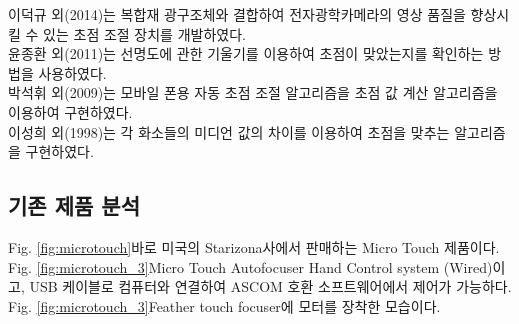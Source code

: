 이덕규 외(2014)는 복합재 광구조체와 결합하여 전자광학카메라의 영상 품질을 향상시킬 수 있는 초점 조절 장치를 개발하였다.\cite{leedukgu2014}\\
윤종환 외(2011)는 선명도에 관한 기울기를 이용하여 초점이 맞았는지를 확인하는 방법을 사용하였다.\cite{yunjonghwan2011lcd}\\
박석휘 외(2009)는 모바일 폰용 자동 초점 조절 알고리즘을 초점 값 계산 알고리즘을 이용하여 구현하였다.\cite{parksukhui2009Median}\\
이성희 외(1998)는 각 화소들의 미디언 값의 차이를 이용하여 초점을 맞추는 알고리즘을 구현하였다.\cite{leeseonghee1998Median}


\subsection{기존 제품 분석}

Fig. \ref{fig:microtouch}\가 바로 미국의 Starizona사에서 판매하는 Micro Touch  제품이다. Fig. \ref{fig:microtouch_3}\가 Micro Touch Autofocuser Hand Control system (Wired)이고, USB 케이블로 컴퓨터와 연결하여 ASCOM 호환 소프트웨어에서 제어가 가능하다.  Fig. \ref{fig:microtouch_3}\는 Feather touch focuser에 모터를 장착한 모습이다. 


